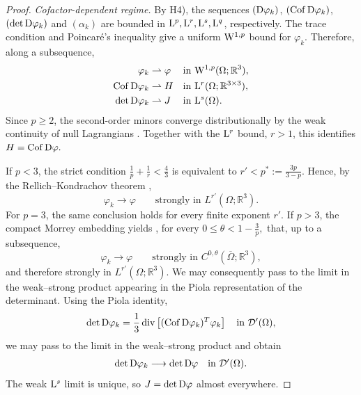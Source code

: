 \documentclass[11pt]{article}
\begin{document}
\begin{proof}
\medskip
\noindent\emph{Cofactor-dependent regime.}
By H4), the sequences $({\rm D}\varphi_k)$, $(\operatorname{Cof}{\rm D}\varphi_k)$, $(\det{\rm D}\varphi_k)$ and $(\alpha_k)$ are bounded in ${\rm L}^p,{\rm L}^r,{\rm L}^s,{\rm L}^q$, respectively. The trace condition and Poincar\'e's inequality give a uniform ${\rm W}^{1,p}$ bound for $\varphi_k$. Therefore, along a subsequence,
\begin{align}
\varphi_k&\rightharpoonup\varphi
&&\text{in }{\rm W}^{1,p}(\Omega;\mathbb R^3),
\notag\\
\operatorname{Cof}{\rm D}\varphi_k&\rightharpoonup H
&&\text{in }{\rm L}^r(\Omega;\mathbb R^{3\times3}),
\notag\\
\det{\rm D}\varphi_k&\rightharpoonup J
&&\text{in }{\rm L}^s(\Omega).
\end{align}
Since $p\geq2$, the second-order minors converge distributionally by the
weak continuity of null Lagrangians
\cite{Ball1977,BallCurrieOlver1981}.
Together with the ${\rm L}^r$ bound, $r>1$, this identifies
$
H=\operatorname{Cof}{\rm D}\varphi.
$


If $p<3$, the strict condition
$
\frac1p+\frac1r<\frac43
$
is equivalent to
$
r'<p^*:=\frac{3p}{3-p}.
$
Hence, by the Rellich--Kondrachov theorem \cite{AdamsFournier2003},
\begin{equation}
\varphi_k\to\varphi
\qquad\text{strongly in }L^{r'}(\Omega;\mathbb R^3).
\end{equation}
For $p=3$, the same conclusion holds for every finite exponent $r'$. If $p>3$, the compact Morrey embedding yields \cite{AdamsFournier2003}, for every
$
0\leq\theta<1-\frac3p,
$
that, up to a subsequence,
\begin{equation}
\varphi_k\to\varphi
\qquad\text{strongly in }
C^{0,\theta}(\overline\Omega;\mathbb R^3),
\end{equation}
and therefore strongly in $L^{r'}(\Omega;\mathbb R^3)$. We may consequently pass to the limit in the weak--strong product appearing in the Piola representation of the determinant.
Using the Piola identity,
\begin{align}
\det{\rm D}\varphi_k
=
\frac13\operatorname{div}\left[
(\operatorname{Cof}{\rm D}\varphi_k)^T\varphi_k
\right]
\quad\text{in }\mathcal D'(\Omega),
\end{align}
we may pass to the limit in the weak--strong product and obtain
\begin{align}
\det{\rm D}\varphi_k
\longrightarrow
\det{\rm D}\varphi
\quad\text{in }\mathcal D'(\Omega).
\end{align}
The weak ${\rm L}^s$ limit is unique, so $J=\det{\rm D}\varphi$ almost everywhere.


\end{proof}
\end{document}
